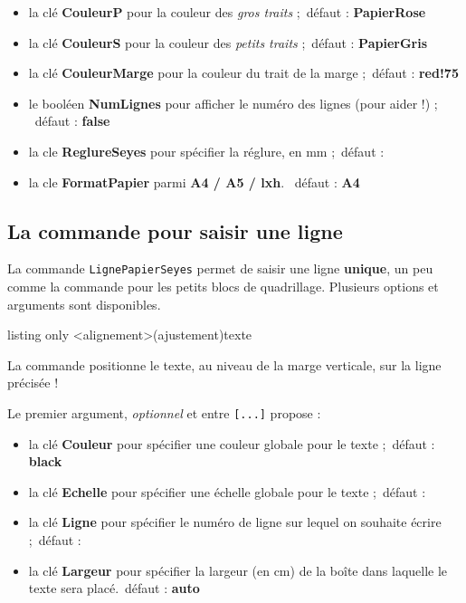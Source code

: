 \documentclass[a4paper]{article}
\newcommand\Cle[1]{{\bfseries\sffamily\textlangle #1\textrangle}}
\begin{document}
\begin{itemize}
	\item la clé \Cle{CouleurP} pour la couleur des \textit{gros traits} ;\hfill~défaut : \Cle{PapierRose}
	\item la clé \Cle{CouleurS} pour la couleur des \textit{petits traits} ;\hfill~défaut : \Cle{PapierGris}
	\item la clé \Cle{CouleurMarge} pour la couleur du trait de la marge ;\hfill~défaut : \Cle{red!75}
	\item le booléen \Cle{NumLignes} pour afficher le numéro des lignes (pour aider !) ; \hfill~défaut : \Cle{false}
	\item la cle \Cle{ReglureSeyes} pour spécifier la réglure, en mm ;\hfill~défaut : \Cle{2}
	\item la cle \Cle{FormatPapier} parmi \Cle{A4 / A5 / lxh}. \hfill~défaut : \Cle{A4}
\end{itemize}

\subsection{La commande pour saisir une ligne}

La commande \texttt{LignePapierSeyes} permet de saisir une ligne \textbf{unique}, un peu comme la commande pour les petits blocs de quadrillage. Plusieurs options et arguments sont disponibles.

\begin{PresentationCode}{listing only}
\LignePapierSeyes[options]<alignement>(ajustement){texte}
\end{PresentationCode}

La commande positionne le \textsf{texte}, au niveau de la marge verticale, sur la ligne précisée !

\smallskip

Le premier argument, \textit{optionnel} et entre \texttt{[...]} propose :

\begin{itemize}
	\item la clé \Cle{Couleur} pour spécifier une couleur globale pour le texte ;\hfill~défaut : \Cle{black}
	\item la clé \Cle{Echelle} pour spécifier une échelle globale pour le texte ;\hfill~défaut : \Cle{1}
	\item la clé \Cle{Ligne} pour spécifier le numéro de ligne sur lequel on souhaite écrire ;\hfill~défaut : \Cle{1}
	\item la clé \Cle{Largeur} pour spécifier la largeur (en cm) de la boîte dans laquelle le texte sera placé.\hfill~défaut : \Cle{auto}
\end{itemize}
\end{document}
